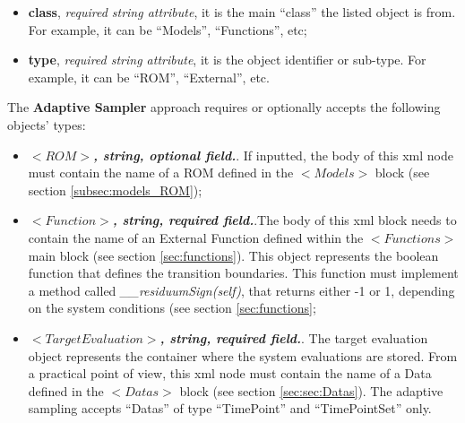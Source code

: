 \begin{itemize}
   \begin{itemize}
     \item \textbf{class}, \textit{required string attribute}, it is the main ``class'' the listed object is from. For example, it can be ``Models'', ``Functions'', etc;
     \item \textbf{type},  \textit{required string attribute}, it is the object identifier or sub-type. For example, it can be ``ROM'', ``External'', etc.
    \end{itemize}
The \textbf{Adaptive Sampler} approach requires or optionally accepts the following objects' types:
   \begin{itemize}
     \item $<ROM>$\textbf{\textit{, string, optional  field.}}. If inputted, the body of this xml node must contain the name of a ROM defined in the $<Models>$ block (see section \ref{subsec:models_ROM});
       \item $<Function>$\textbf{\textit{, string, required field.}}.The body of this xml block needs to contain the name of an External Function defined within the $<Functions>$ main block (see section \ref{sec:functions}). This object represents the boolean function that defines the transition boundaries. This function must implement a method called \textit{\_\_residuumSign(self)}, that returns either -1 or 1, depending on the system conditions (see section \ref{sec:functions};
        \item $<TargetEvaluation>$\textbf{\textit{, string, required field.}}. The target evaluation object represents the container where the system evaluations are stored. From a practical point of view, this xml node must contain the name of a Data defined in the $<Datas>$ block (see section \ref{sec:sec:Datas}). The adaptive sampling accepts ``Datas'' of type ``TimePoint''  and ``TimePointSet'' only.
    \end{itemize}
    
\end{itemize}



